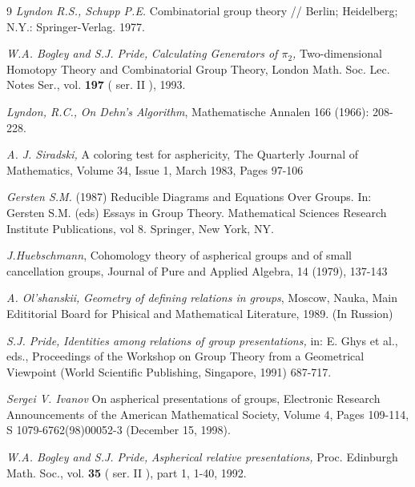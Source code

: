 \documentclass[12pt,reqno]{amsart}
\begin{document}
\begin{thebibliography}{9}
 { {\it Lyndon R.S., Schupp P.E.}
Combinatorial group theory // Berlin; Heidelberg; N.Y.:
Springer-Verlag. 1977. }

 {\it W.A. Bogley and S.J. Pride,} {\it
Calculating Generators of $\pi_2$,} Two-dimensional Homotopy
Theory and Combinatorial Group Theory, London Math. Soc. Lec.
Notes Ser., vol. {\bf 197} ( ser. II ), 1993.

 { {\it Lyndon, R.C.,} {\it On Dehn's Algorithm}, Mathematische Annalen 166 (1966): 208-228.}

 { {\it A. J. Siradski,} A coloring test for asphericity, The Quarterly Journal of Mathematics, Volume 34, Issue 1, March 1983, Pages 97-106}

 { {\it   Gersten S.M.} (1987) Reducible Diagrams and Equations Over Groups. In: Gersten S.M. (eds) Essays in Group Theory. Mathematical Sciences Research Institute Publications, vol 8. Springer, New York, NY.}


 {{\it J.Huebschmann}, Cohomology theory of aspherical groups and of small cancellation groups, Journal of Pure and Applied Algebra, 14 (1979), 137-143}


        { {\it A. Ol'shanskii,} {\it Geometry of defining relations in groups}, Moscow, Nauka, Main Edititorial Board for Phisical and Mathematical Literature, 1989. (In Russion)}


 {\it S.J. Pride,} {\it
Identities among relations of group presentations,} in: E. Ghys et
al., eds., Proceedings of the Workshop on Group Theory from a
Geometrical Viewpoint (World Scientific Publishing, Singapore,
1991) 687-717.

 {\it Sergei V. Ivanov} On aspherical presentations of groups, Electronic Research Announcements of the American Mathematical Society, Volume 4, Pages 109-114, S 1079-6762(98)00052-3 (December 15, 1998).



 {\it W.A. Bogley and
S.J. Pride,} {\it Aspherical relative presentations,} Proc.
Edinburgh Math. Soc., vol. {\bf 35} ( ser. II ), part 1, 1-40,
1992.




\end{thebibliography}
\end{document}
